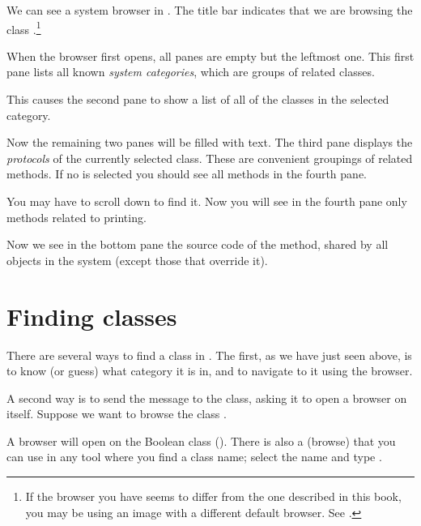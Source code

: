 \documentclass[a4paper,10pt,twoside]{book}
\begin{document}
We can see a system browser in .
The title bar indicates that we are browsing the class .\footnote{If the browser you have seems to differ from the one described in this book, you may be using an image with a different default browser. See .}

When the browser first opens, all panes are empty but the leftmost one.
This first pane lists all known \emph{system categories}, which are groups of related classes.

This causes the second pane to show a list of all of the classes in the selected category.

Now the remaining two panes will be filled with text.
The third pane displays the \emph{protocols} of the currently selected class.
These are convenient groupings of related methods.
If no  is selected you should see all methods in the fourth pane.

You may have to scroll down to find it.
Now you will see in the fourth pane only methods related to printing.

Now we see in the bottom pane the source code of the  method, shared by all objects in the system (except those that override it).

\section{Finding classes}

There are several ways to find a class in \sq.  The first, as we have just seen above, is to know (or guess) what category it is in, and to navigate to it using the browser.

A second way is to send the  message to the class, asking it to open a browser on itself.  Suppose we want to browse the class .

A browser will open on the Boolean class ().
There is also a   (browse) that you can use in any tool where you find a class name;
select the name and type .
\end{document}
